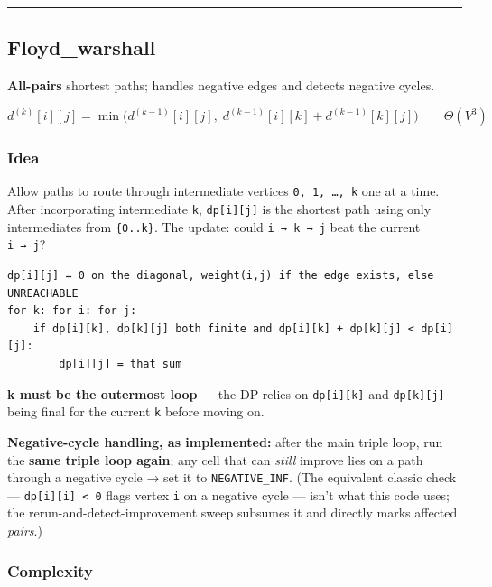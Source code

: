 \documentclass[
  10pt,
  letterpaper,
  onecolumn]{article}
\begin{document}
\begin{center}\rule{0.5\linewidth}{0.5pt}\end{center}

\hypertarget{floyd_warshall}{%
\subsection{Floyd\_warshall}\label{floyd_warshall}}

\textbf{All-pairs} shortest paths; handles negative edges and detects
negative cycles.

\begin{equation*}
d^{(k)}[i][j]=\min\bigl(d^{(k-1)}[i][j],\;d^{(k-1)}[i][k]+d^{(k-1)}[k][j]\bigr)
\qquad \Theta(V^3)
\end{equation*}

\hypertarget{idea-19}{%
\subsubsection{Idea}\label{idea-19}}

Allow paths to route through intermediate vertices
\texttt{0,\ 1,\ …,\ k} one at a time. After incorporating intermediate
\texttt{k}, \texttt{dp{[}i{]}{[}j{]}} is the shortest path using only
intermediates from \texttt{\{0..k\}}. The update: could
\texttt{i\ →\ k\ →\ j} beat the current \texttt{i\ →\ j}?

\begin{verbatim}
dp[i][j] = 0 on the diagonal, weight(i,j) if the edge exists, else UNREACHABLE
for k: for i: for j:
    if dp[i][k], dp[k][j] both finite and dp[i][k] + dp[k][j] < dp[i][j]:
        dp[i][j] = that sum
\end{verbatim}

\textbf{k must be the outermost loop} --- the DP relies on
\texttt{dp{[}i{]}{[}k{]}} and \texttt{dp{[}k{]}{[}j{]}} being final for
the current \texttt{k} before moving on.

\textbf{Negative-cycle handling, as implemented:} after the main triple
loop, run the \textbf{same triple loop again}; any cell that can
\emph{still} improve lies on a path through a negative cycle → set it to
\texttt{NEGATIVE\_INF}. (The equivalent classic check ---
\texttt{dp{[}i{]}{[}i{]}\ \textless{}\ 0} flags vertex \texttt{i} on a
negative cycle --- isn't what this code uses; the
rerun-and-detect-improvement sweep subsumes it and directly marks
affected \emph{pairs}.)

\hypertarget{complexity-19}{%
\subsubsection{Complexity}\label{complexity-19}}
\end{document}
